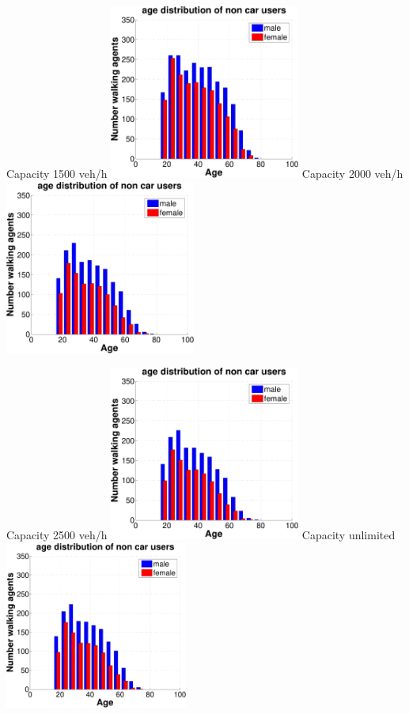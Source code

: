 {  \createsubfigure%
  {Capacity 1500 veh/h}%
  {\includegraphics[width=0.47\textwidth, angle=0, trim=0mm 0mm 0mm 9mm, clip=true]{extending/figures/MultiModalSimulation/simulations/age_distribution_1500}}%
  {\label{}}%
  {\hspace{3mm}}%
  \createsubfigure%
  {Capacity 2000 veh/h}%
  {\includegraphics[width=0.47\textwidth, angle=0, trim=0mm 0mm 0mm 9mm, clip=true]{extending/figures/MultiModalSimulation/simulations/age_distribution_2000}}%
  {\label{}}%
  {\vspace{5.5mm}}%

  \createsubfigure%
  {Capacity 2500 veh/h}%
  {\includegraphics[width=0.47\textwidth, angle=0, trim=0mm 0mm 0mm 9mm, clip=true]{extending/figures/MultiModalSimulation/simulations/age_distribution_2500}}%
  {\label{}}%
  {\hspace{3mm}}%
  \createsubfigure%
  {Capacity unlimited}%
  {\includegraphics[width=0.45\textwidth, angle=0, trim=0mm 0mm 0mm 9mm, clip=true]{extending/figures/MultiModalSimulation/simulations/age_distribution_unlimited}}%
  {\label{}}%
  {}%
}%
